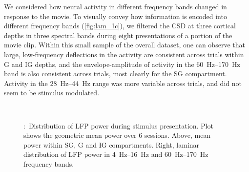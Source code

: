 We considered how neural activity in different frequency bands changed in response to the movie.
To visually convey how information is encoded into different frequency bands (\autoref{fig:lam_1c}), we filtered the \ac{CSD} at three cortical depths in three spectral bands during eight presentations of a portion of the movie clip.
Within this small sample of the overall dataset, one can observe that large, low-frequency deflections in the activity are consistent across trials within \ac{G} and \ac{IG} depths, and the envelope-amplitude of activity in the \SIrange{60}{170}{Hz} band is also consistent across trials, most clearly for the \ac{SG} compartment.
Activity in the \SIrange{28}{44}{Hz} range was more variable across trials, and did not seem to be stimulus modulated.


\begin{figure}[htbp]%
    \centering
    \hspace*{\fill}
    \hspace*{\fill}\hspace{.2cm}\hspace*{\fill}
    \hspace*{\fill}
    \\
    \hspace*{\fill}
    \hspace*{\fill}\hspace{.2cm}\hspace*{\fill}
    \hspace*{\fill}
    \caption{
\protect{}:~Distribution of \ac{LFP} power during stimulus presentation.
Plot shows the geometric mean power over \num{6} sessions.
Above, mean power within \ac{SG}, \ac{G} and \ac{IG} compartments.
Right, laminar distribution of \ac{LFP} power in \SIrange{4}{16}{Hz} and \SIrange{60}{170}{Hz} frequency bands.
}
\end{figure}
